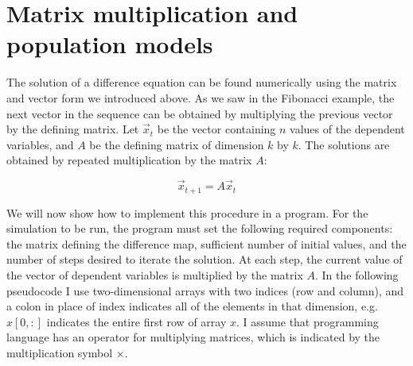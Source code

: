 \documentclass[
  letterpaper,
  DIV=11,
  numbers=noendperiod]{scrreprt}
\begin{document}

\hypertarget{matrix-multiplication-and-population-models}{%
\chapter{Matrix multiplication and population
models}\label{matrix-multiplication-and-population-models}}

The solution of a difference equation can be found numerically using the
matrix and vector form we introduced above. As we saw in the Fibonacci
example, the next vector in the sequence can be obtained by multiplying
the previous vector by the defining matrix. Let \(\vec x_t\) be the
vector containing \(n\) values of the dependent variables, and \(A\) be
the defining matrix of dimension \(k\) by \(k\). The solutions are
obtained by repeated multiplication by the matrix \(A\):

\[
\vec x_{t+1} = A  \vec x_{t}
\]

We will now show how to implement this procedure in a program. For the
simulation to be run, the program must set the following required
components: the matrix defining the difference map, sufficient number of
initial values, and the number of steps desired to iterate the solution.
At each step, the current value of the vector of dependent variables is
multiplied by the matrix \(A\). In the following pseudocode I use
two-dimensional arrays with two indices (row and column), and a colon in
place of index indicates all of the elements in that dimension,
e.g.~\(x[0,:]\) indicates the entire first row of array \(x\). I assume
that programming language has an operator for multiplying matrices,
which is indicated by the multiplication symbol \(\times\).
\end{document}
